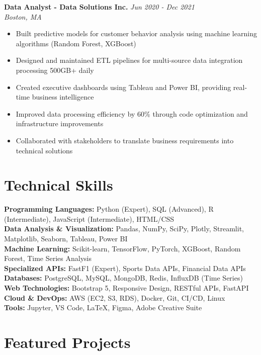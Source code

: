 \documentclass[letterpaper,11pt]{article}
\begin{document}
\textbf{Data Analyst - Data Solutions Inc.} \hfill \textit{Jun 2020 - Dec 2021}\\
\textit{Boston, MA}
\begin{itemize}[leftmargin=0.5in, itemsep=0pt]
    \item Built predictive models for customer behavior analysis using machine learning algorithms (Random Forest, XGBoost)
    \item Designed and maintained ETL pipelines for multi-source data integration processing 500GB+ daily
    \item Created executive dashboards using Tableau and Power BI, providing real-time business intelligence
    \item Improved data processing efficiency by 60\% through code optimization and infrastructure improvements
    \item Collaborated with stakeholders to translate business requirements into technical solutions
\end{itemize}

\section{Technical Skills}

\textbf{Programming Languages:} Python (Expert), SQL (Advanced), R (Intermediate), JavaScript (Intermediate), HTML/CSS\\
\textbf{Data Analysis \& Visualization:} Pandas, NumPy, SciPy, Plotly, Streamlit, Matplotlib, Seaborn, Tableau, Power BI\\
\textbf{Machine Learning:} Scikit-learn, TensorFlow, PyTorch, XGBoost, Random Forest, Time Series Analysis\\
\textbf{Specialized APIs:} FastF1 (Expert), Sports Data APIs, Financial Data APIs\\
\textbf{Databases:} PostgreSQL, MySQL, MongoDB, Redis, InfluxDB (Time Series)\\
\textbf{Web Technologies:} Bootstrap 5, Responsive Design, RESTful APIs, FastAPI\\
\textbf{Cloud \& DevOps:} AWS (EC2, S3, RDS), Docker, Git, CI/CD, Linux\\
\textbf{Tools:} Jupyter, VS Code, LaTeX, Figma, Adobe Creative Suite

\section{Featured Projects}
\end{document}
